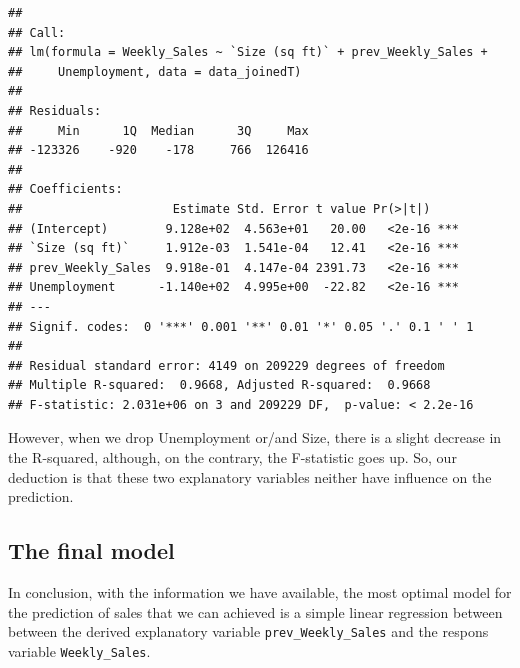 \documentclass[11pt,]{article}
\newenvironment{Shaded}{\begin{snugshade}}{\end{snugshade}}
\newcommand{\KeywordTok}[1]{\textcolor[rgb]{0.13,0.29,0.53}{\textbf{{#1}}}}
\newcommand{\DataTypeTok}[1]{\textcolor[rgb]{0.13,0.29,0.53}{{#1}}}
\newcommand{\StringTok}[1]{\textcolor[rgb]{0.31,0.60,0.02}{{#1}}}
\newcommand{\CommentTok}[1]{\textcolor[rgb]{0.56,0.35,0.01}{\textit{{#1}}}}
\newcommand{\NormalTok}[1]{{#1}}
\begin{document}
\begin{verbatim}
## 
## Call:
## lm(formula = Weekly_Sales ~ `Size (sq ft)` + prev_Weekly_Sales + 
##     Unemployment, data = data_joinedT)
## 
## Residuals:
##     Min      1Q  Median      3Q     Max 
## -123326    -920    -178     766  126416 
## 
## Coefficients:
##                     Estimate Std. Error t value Pr(>|t|)    
## (Intercept)        9.128e+02  4.563e+01   20.00   <2e-16 ***
## `Size (sq ft)`     1.912e-03  1.541e-04   12.41   <2e-16 ***
## prev_Weekly_Sales  9.918e-01  4.147e-04 2391.73   <2e-16 ***
## Unemployment      -1.140e+02  4.995e+00  -22.82   <2e-16 ***
## ---
## Signif. codes:  0 '***' 0.001 '**' 0.01 '*' 0.05 '.' 0.1 ' ' 1
## 
## Residual standard error: 4149 on 209229 degrees of freedom
## Multiple R-squared:  0.9668, Adjusted R-squared:  0.9668 
## F-statistic: 2.031e+06 on 3 and 209229 DF,  p-value: < 2.2e-16
\end{verbatim}

However, when we drop Unemployment or/and Size, there is a slight
decrease in the R-squared, although, on the contrary, the F-statistic
goes up. So, our deduction is that these two explanatory variables
neither have influence on the prediction.

\begin{Shaded}
\end{Shaded}

\subsection{The final model}\label{the-final-model}

In conclusion, with the information we have available, the most optimal
model for the prediction of sales that we can achieved is a simple
linear regression between between the derived explanatory variable
\texttt{prev\_Weekly\_Sales} and the respons variable
\texttt{Weekly\_Sales}.

\begin{Shaded}
\end{Shaded}
\end{document}
